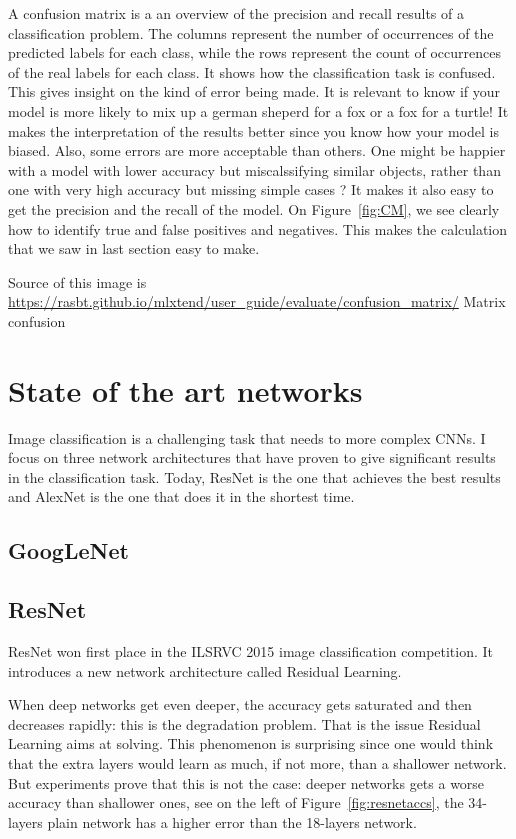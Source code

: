 A confusion matrix is a an overview of the precision and recall results of a classification problem. The columns represent the number of occurrences of the predicted labels for each class, while the rows represent the count of occurrences of the real labels for each class. It shows how the classification task is confused. This gives insight on the kind of error being made. It is relevant to know if your model is more likely to mix up  a german sheperd for a fox or a fox for a turtle! It makes the interpretation of the results better since you know how your model is biased. Also, some errors are more acceptable than others. One might be happier with a model with lower accuracy but miscalssifying similar objects, rather than one with very high accuracy but missing simple cases ?
It makes it also easy to get the precision and the recall of the model. On Figure~\ref{fig:CM}, we see clearly how to identify true and false positives and negatives. This makes the calculation that we saw in last section easy to make. 

Source of this image is \url{https://rasbt.github.io/mlxtend/user_guide/evaluate/confusion_matrix/} Matrix confusion



\section{State of the art networks}
Image classification is a challenging task that needs to more complex CNNs. I focus on three network architectures that have proven to give significant results in the classification task. Today, ResNet is the one that achieves the best results and AlexNet is the one that does it in the shortest time.    
\subsection{GoogLeNet}
\subsection{ResNet}
ResNet won first place in the ILSRVC 2015 image classification competition. It introduces a new network architecture called Residual Learning. 

When deep networks get even deeper, the accuracy gets saturated and then decreases rapidly: this is the degradation problem. That is the issue Residual Learning aims at solving. This phenomenon is surprising since one would think that the extra layers would learn as much, if not more, than a shallower network. But experiments prove that this is not the case: deeper networks gets a worse accuracy than shallower ones, see on the left of Figure~\ref{fig:resnetaccs}, the 34-layers plain network has a higher error than the 18-layers network. 

